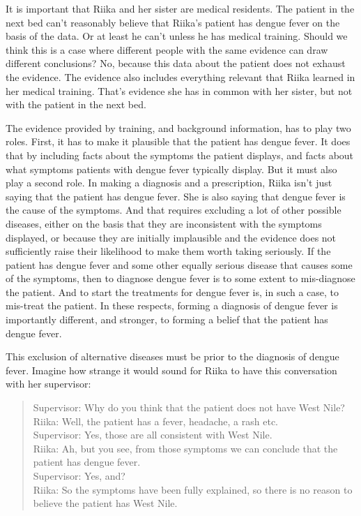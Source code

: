 \documentclass[
  10pt,
  letterpaper,
  twoside]{scrbook}
\begin{document}
It is important that {Riika} and her sister are medical residents. The
patient in the next bed can't reasonably believe that {Riika}'s patient
has dengue fever on the basis of the data. Or at least he can't unless
he has medical training. Should we think this is a case where different
people with the same evidence can draw different conclusions? No,
because this data about the patient does not exhaust the evidence. The
evidence also includes everything relevant that {Riika} learned in her
medical training. That's evidence she has in common with her sister, but
not with the patient in the next bed.

The evidence provided by training, and background information, has to
play two roles. First, it has to make it plausible that the patient has
dengue fever. It does that by including facts about the symptoms the
patient displays, and facts about what symptoms patients with dengue
fever typically display. But it must also play a second role. In making
a diagnosis and a prescription, {Riika} isn't just saying that the
patient has dengue fever. She is also saying that dengue fever is the
cause of the symptoms. And that requires excluding a lot of other
possible diseases, either on the basis that they are inconsistent with
the symptoms displayed, or because they are initially implausible and
the evidence does not sufficiently raise their likelihood to make them
worth taking seriously. If the patient has dengue fever and some other
equally serious disease that causes some of the symptoms, then to
diagnose dengue fever is to some extent to mis-diagnose the patient. And
to start the treatments for dengue fever is, in such a case, to
mis-treat the patient. In these respects, forming a diagnosis of dengue
fever is importantly different, and stronger, to forming a belief that
the patient has dengue fever.

This exclusion of alternative diseases must be prior to the diagnosis of
dengue fever. Imagine how strange it would sound for {Riika} to have
this conversation with her supervisor:

\begin{quote}
Supervisor: Why do you think that the patient does not have West Nile?\\
{Riika}: Well, the patient has a fever, headache, a rash etc.\\
Supervisor: Yes, those are all consistent with West Nile.\\
{Riika}: Ah, but you see, from those symptoms we can conclude that the
patient has dengue fever.\\
Supervisor: Yes, and?\\
{Riika}: So the symptoms have been fully explained, so there is no
reason to believe the patient has West Nile.
\end{quote}
\end{document}
